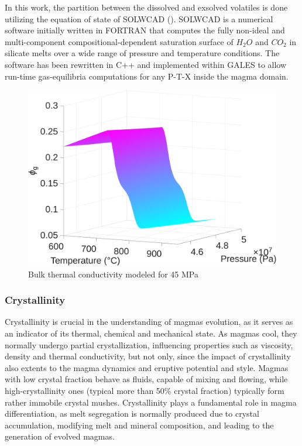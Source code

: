 In this work, the partition between the dissolved and exsolved volatiles is done utilizing the equation of state of SOLWCAD (\cite{papale2006}). SOLWCAD is a numerical software initially written in FORTRAN that computes the fully non-ideal and multi-component compositional-dependent saturation surface of $H_2O$ and $CO_2$ in silicate melts over a wide range of pressure and temperature conditions. The software has been rewritten in C++ and implemented within GALES  to allow run-time gas-equilibria computations for any P-T-X inside the magma domain. 

\begin{figure}
    \centering
    \includegraphics[width=1\linewidth]{img/chapter2/properties/vf_g/vf_g.png}
    \caption{Bulk thermal conductivity modeled for 45 MPa}
    \label{fig:enter-label}
\end{figure}

\subsubsection{Crystallinity}
Crystallinity is crucial in the understanding of magmas evolution, as it serves as an indicator of its thermal, chemical and mechanical state. As magmas cool, they normally undergo partial crystallization, influencing properties such as viscosity, density and thermal conductivity, but not only, since the impact of crystallinity also extents to the magma dynamics and eruptive potential and style. Magmas with low crystal fraction behave as fluids, capable of mixing and flowing, while high-crystallinity ones (typical more than 50\% crystal fraction) typically form rather immobile crystal mushes. Crystallinity plays a fundamental role in magma differentiation, as melt segregation is normally produced due to crystal accumulation, modifying melt and mineral composition, and leading to the generation of evolved magmas.

